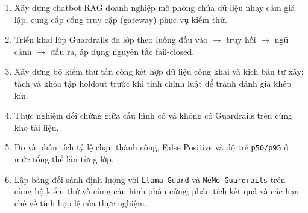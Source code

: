 {\begin{itemize}
\begin{enumerate}
    \setlength{\itemsep}{1pt}
    \setlength{\parskip}{0pt}
    \setlength{\topsep}{1pt}
    \item Xây dựng chatbot RAG doanh nghiệp mô phỏng chứa dữ liệu nhạy cảm giả lập, cung cấp cổng truy cập (gateway) phục vụ kiểm thử.
    \item Triển khai lớp Guardrails đa lớp theo luồng đầu vào $\rightarrow$ truy hồi $\rightarrow$ ngữ cảnh $\rightarrow$ đầu ra, áp dụng nguyên tắc fail-closed.
    \item Xây dựng bộ kiểm thử tấn công kết hợp dữ liệu công khai và kịch bản tự xây; tách và khóa tập holdout trước khi tinh chỉnh luật để tránh đánh giá khép kín.
    \item Thực nghiệm đối chứng giữa cấu hình có và không có Guardrails trên cùng kho tài liệu.
    \item Đo và phân tích tỷ lệ chặn thành công, False Positive và độ trễ \texttt{p50/p95} ở mức tổng thể lẫn từng lớp.
    \item Lập bảng đối sánh định lượng với \texttt{Llama Guard} và \texttt{NeMo Guardrails} trên cùng bộ kiểm thử và cùng cấu hình phần cứng; phân tích kết quả và các hạn chế về tính hợp lệ của thực nghiệm.
  \end{enumerate}
\end{itemize}
}
